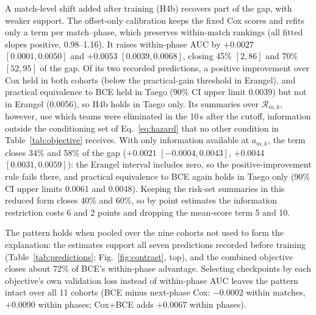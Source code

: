 \documentclass[sigconf,anonymous]{acmart}
\begin{document}
A match-level shift added after training (H4b) recovers part of the gap, with weaker support. The offset-only calibration keeps the fixed Cox scores and refits only a term per match--phase, which preserves within-match rankings (all fitted slopes positive, 0.98--1.16). It raises within-phase AUC by $+0.0027$ $[0.0001,\allowbreak 0.0050]$ and $+0.0053$ $[0.0039,\allowbreak 0.0068]$, closing 45\% $[2,\allowbreak 86]$ and 70\% $[52,\allowbreak 95]$ of the gap. Of its two recorded predictions, a positive improvement over Cox held in both cohorts (below the practical-gain threshold in Erangel), and practical equivalence to BCE held in Taego (90\% CI upper limit 0.0039) but not in Erangel (0.0056), so H4b holds in Taego only. Its summaries over $\mathcal{R}_{m,k}$, however, use which teams were eliminated in the 10\,s after the cutoff, information outside the conditioning set of Eq.~\eqref{eq:hazard} that no other condition in Table~\ref{tab:objective} receives. With only information available at $a_{m,k}$, the term closes 34\% and 58\% of the gap ($+0.0021$ $[-0.0004,\allowbreak 0.0043]$, $+0.0044$ $[0.0031,\allowbreak 0.0059]$): the Erangel interval includes zero, so the positive-improvement rule fails there, and practical equivalence to BCE again holds in Taego only (90\% CI upper limits 0.0061 and 0.0048). Keeping the risk-set summaries in this reduced form closes 40\% and 60\%, so by point estimates the information restriction costs 6 and 2 points and dropping the mean-score term 5 and 10.


The pattern holds when pooled over the nine cohorts not used to form the explanation: the estimates support all seven predictions recorded before training (Table~\ref{tab:predictions}; Fig.~\ref{fig:contrast}, top), and the combined objective closes about 72\% of BCE's within-phase advantage. Selecting checkpoints by each objective's own validation loss instead of within-phase AUC leaves the pattern intact over all 11 cohorts (BCE minus next-phase Cox: $-0.0002$ within matches, $+0.0090$ within phases; Cox+BCE adds $+0.0067$ within phases).
\end{document}

